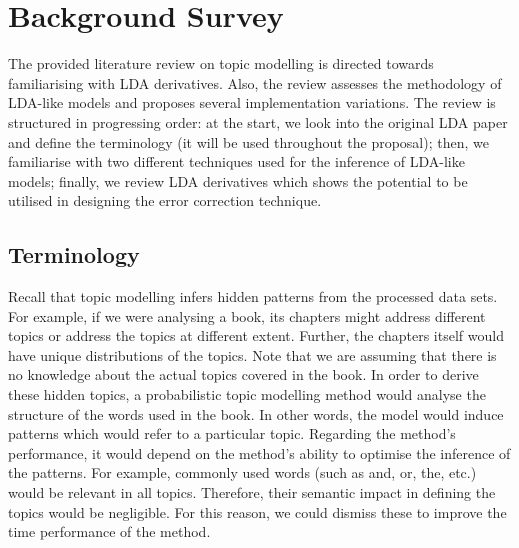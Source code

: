 \documentclass{mprop}
\begin{document}
\section{Background Survey}

\par The provided literature review on topic modelling is directed towards familiarising with LDA derivatives. Also, the review assesses the methodology of LDA-like models and proposes several implementation variations. The review is structured in progressing order: at the start, we look into the original LDA paper and define the terminology (it will be used throughout the proposal); then, we familiarise with two different techniques used for the inference of LDA-like models; finally, we review LDA derivatives which shows the potential to be utilised in designing the error correction technique.

\subsection{Terminology}

\par Recall that topic modelling infers hidden patterns from the processed data sets. For example, if we were analysing a book, its chapters might address different topics or address the topics at different extent. Further, the chapters itself would have unique distributions of the topics. Note that we are assuming that there is no knowledge about the actual topics covered in the book. In order to derive these hidden topics, a probabilistic topic modelling method would analyse the structure of the words used in the book. In other words, the model would induce patterns which would refer to a particular topic. Regarding the method's performance, it would depend on the method's ability to optimise the inference of the patterns. For example, commonly used words (such as and, or, the, etc.) would be relevant in all topics. Therefore, their semantic impact in defining the topics would be negligible. For this reason, we could dismiss these to improve the time performance of the method. 
\end{document}
